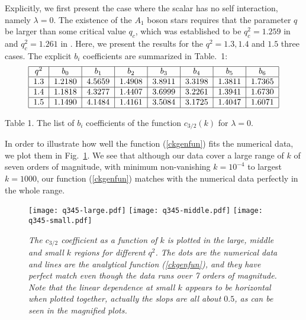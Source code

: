 \documentclass[11pt]{article}
\newcommand{\be}{\begin{equation}}
\newcommand{\ee}{\end{equation}}
\begin{document}
Explicitly, we first present the case where the scalar has no self interaction, namely $\lambda=0$.  The existence of the $A_1$ boson stars requires that the parameter $q$ be larger than some critical value $q_c$, which was established to be $q_c^2=1.259$ in \cite{Gentle:2011kv} and $q_c^2=1.261$ in \cite{Liu:2020uaz}.  Here, we present the results for the $q^2=1.3, 1.4 $ and $1.5$ three cases. The explicit $b_i$ coefficients are summarized in Table.~1:
\be
\begin{tabular}{|c|c|c|c|c|c|c|c|}
  \hline
  $q^2$ & $b_0$ & $b_1$ & $b_2$ & $b_3$ & $b_4$ & $b_5$ & $b_6$ \\
  \hline
  $1.3$ & $1.2180$ & $4.5659$ & $1.4908$ & $3.8911$ & $3.3198$ & $1.3811$ & $1.7365$ \\
  \hline
  $1.4$ & $1.1818$ & $4.3277$ & $1.4407$ & $3.6999$ & $3.2261$ & $1.3941$ & $1.6730$ \\
  \hline
  $1.5$ & $1.1490$ & $4.1484$ & $1.4161$ & $3.5084$ & $3.1725$ & $1.4047$ & $1.6071$ \\
  \hline
\end{tabular}
\ee
\centerline{Table 1. \small The list of $b_i$ coefficients of the function $c_{3/2}(k)$ for $\lambda=0$.}

In order to illustrate how well the function (\ref{ckgenfun}) fits the numerical data, we plot them in Fig.~\ref{q345-all}.  We see that although our data cover a large range of $k$ of seven orders of magnitude, with minimum non-vanishing $k=10^{-4}$ to largest $k=1000$, our function (\ref{ckgenfun}) matches with the numerical data perfectly in the whole range.

\begin{figure}[htp]
\begin{center}
\texttt{[image: q345-large.pdf]}
\texttt{[image: q345-middle.pdf]}
\texttt{[image: q345-small.pdf]}
\end{center}
\caption{\small\it The $c_{3/2}$ coefficient as a function of $k$ is plotted in the large, middle and small $k$ regions for different $q^2$.  The dots are the numerical data and lines are the analytical function (\ref{ckgenfun}), and they have perfect match even though the data runs over 7 orders of magnitude.  Note that the linear dependence at small $k$ appears to be horizontal when plotted together, actually the slops are all about $0.5$, as can be seen in the magnified plots.}
\label{q345-all}
\end{figure}
\end{document}

